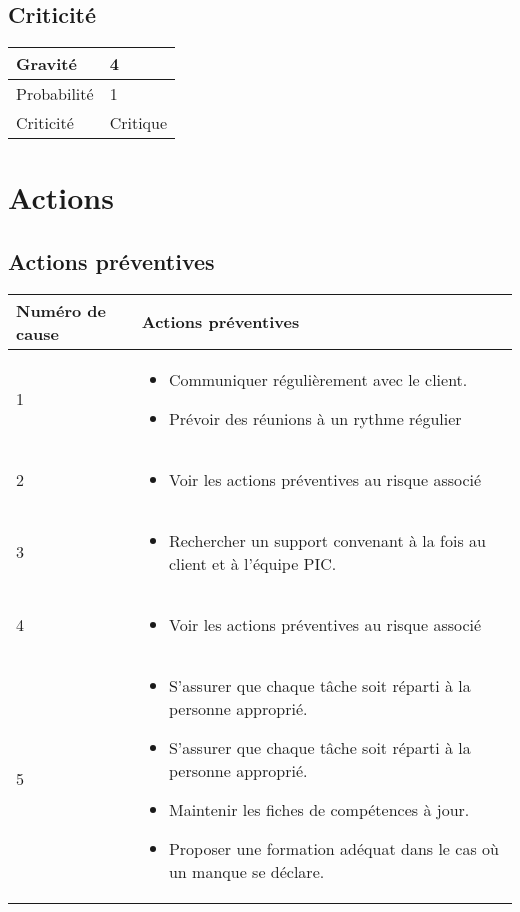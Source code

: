 \subsection*{Criticité}

\begin{table}[H]
\centering
	\begin{tabularx}{16.8cm}{|>{\columncolor{gray!40}}X|X|}
	\hline
	Gravité & 4\\
	\hline
	Probabilité & 1\\
	\hline
	Criticité & Critique\\
	\hline
	\end{tabularx}
\end{table}
\newpage

\section*{Actions}
\subsection*{Actions préventives}

\centering
	\begin{longtable}{|p{7cm}|p{7cm}|}
	\hline
	\rowcolor{gray!40} Numéro de cause & Actions préventives \\
	\hline
	 1 & \begin{itemize}
	 	\item Communiquer régulièrement avec le client.
	 	\item
	 	Prévoir des réunions à un rythme régulier
	 \end{itemize} \\
	\hline
	2 & \begin{itemize}
		\item Voir les actions préventives au risque associé 
	\end{itemize} \\
	\hline
	3 & \begin{itemize}
		\item Rechercher un support convenant à la fois au client et à l'équipe PIC.
	\end{itemize} \\
	\hline
	4 & \begin{itemize}
		\item Voir les actions préventives au risque associé 
	\end{itemize} \\
	\hline
	5 & \begin{itemize}
		\item S'assurer que chaque tâche soit réparti
à la personne approprié.
	\item
	S'assurer que chaque tâche soit réparti
à la personne approprié.
\item Maintenir les fiches de compétences à jour. 
\item Proposer une formation adéquat dans le cas où un manque se déclare.	
	
	\end{itemize} \\
	\hline
	\end{longtable}

